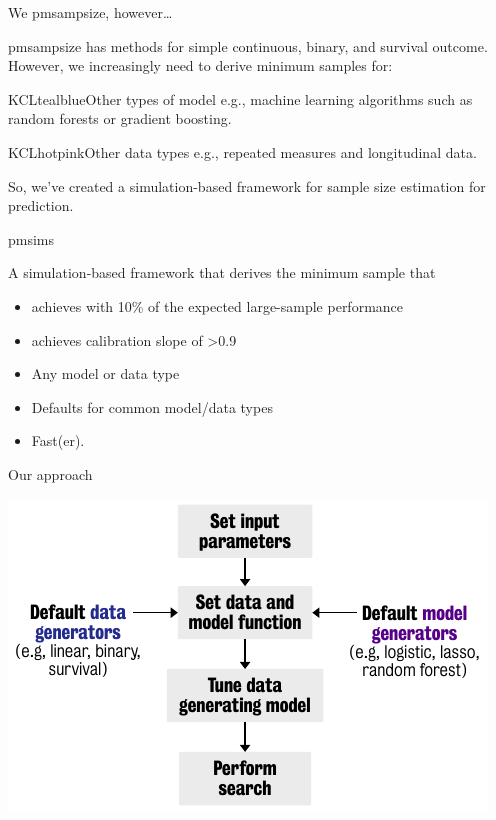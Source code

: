 \documentclass[11pt]{beamer}
\newcommand*{\img}[1]{%
    \raisebox{-.3\baselineskip}{%
        \texttt{[image: \#1]}%
    }%
}
\begin{document}
\begin{frame}[t]{We \img{figures/heart.png} pmsampsize, however\ldots}

    pmsampsize has methods for simple continuous, binary, and survival outcome. However, we increasingly need to derive minimum samples for:\

\begin{cbox}{KCLtealblue}{Other types of model}
e.g., machine learning algorithms such as random forests or gradient boosting.
\end{cbox}

\begin{cbox}{KCLhotpink}{Other data types}{}
e.g., repeated measures and longitudinal data.
\end{cbox}

So, we've created a simulation-based framework for sample size estimation for prediction.

\end{frame}

\begin{frame}{pmsims}

    A simulation-based framework that derives the minimum sample that

    \begin{itemize}
        \item achieves with 10\% of the expected large-sample performance
        \item achieves calibration slope of >0.9
    \end{itemize}

    \begin{itemize}
        \item Any model or data type
        \item Defaults for common model/data types
        \item Fast(er).
    \end{itemize}

\end{frame}

\begin{frame}[c]{Our approach}

    \includegraphics[width=\textwidth]{figures/workflow1.pdf}

\end{frame}
\end{document}
